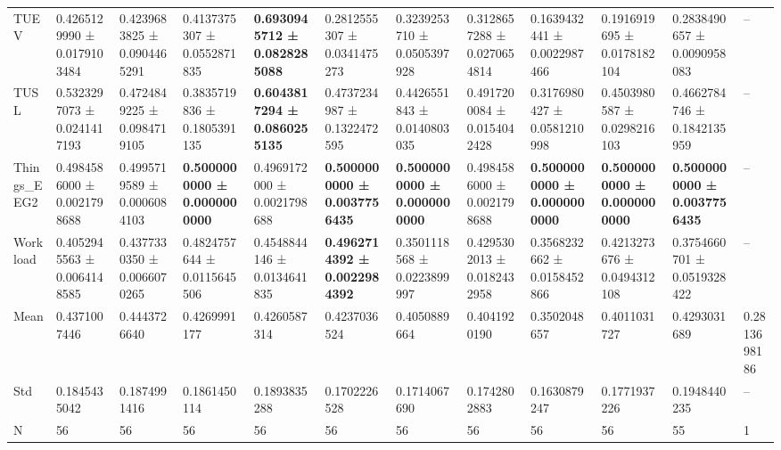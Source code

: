 \begin{table}[htbp]
\begin{tabular}{llllllllllll}
TUEV & 0.4265129990 ± 0.0179103484 & 0.4239683825 ± 0.0904465291 & 0.4137375307 ± 0.0552871835 & \bfseries 0.6930945712 ± 0.0828285088 & 0.2812555307 ± 0.0341475273 & 0.3239253710 ± 0.0505397928 & 0.3128657288 ± 0.0270654814 & 0.1639432441 ± 0.0022987466 & 0.1916919695 ± 0.0178182104 & 0.2838490657 ± 0.0090958083 & -- \\
TUSL & 0.5323297073 ± 0.0241417193 & 0.4724849225 ± 0.0984719105 & 0.3835719836 ± 0.1805391135 & \bfseries 0.6043817294 ± 0.0860255135 & 0.4737234987 ± 0.1322472595 & 0.4426551843 ± 0.0140803035 & 0.4917200084 ± 0.0154042428 & 0.3176980427 ± 0.0581210998 & 0.4503980587 ± 0.0298216103 & 0.4662784746 ± 0.1842135959 & -- \\
Things_EEG2 & 0.4984586000 ± 0.0021798688 & 0.4995719589 ± 0.0006084103 & \bfseries 0.5000000000 ± 0.0000000000 & 0.4969172000 ± 0.0021798688 & \bfseries 0.5000000000 ± 0.0037756435 & \bfseries 0.5000000000 ± 0.0000000000 & 0.4984586000 ± 0.0021798688 & \bfseries 0.5000000000 ± 0.0000000000 & \bfseries 0.5000000000 ± 0.0000000000 & \bfseries 0.5000000000 ± 0.0037756435 & -- \\
Workload & 0.4052945563 ± 0.0064148585 & 0.4377330350 ± 0.0066070265 & 0.4824757644 ± 0.0115645506 & 0.4548844146 ± 0.0134641835 & \bfseries 0.4962714392 ± 0.0022984392 & 0.3501118568 ± 0.0223899997 & 0.4295302013 ± 0.0182432958 & 0.3568232662 ± 0.0158452866 & 0.4213273676 ± 0.0494312108 & 0.3754660701 ± 0.0519328422 & -- \\
Mean & 0.4371007446 & 0.4443726640 & 0.4269991177 & 0.4260587314 & 0.4237036524 & 0.4050889664 & 0.4041920190 & 0.3502048657 & 0.4011031727 & 0.4293031689 & 0.2813698186 \\
Std & 0.1845435042 & 0.1874991416 & 0.1861450114 & 0.1893835288 & 0.1702226528 & 0.1714067690 & 0.1742802883 & 0.1630879247 & 0.1771937226 & 0.1948440235 & -- \\
N & 56 & 56 & 56 & 56 & 56 & 56 & 56 & 56 & 56 & 55 & 1 \\
\bottomrule
\end{tabular}
\end{table}
